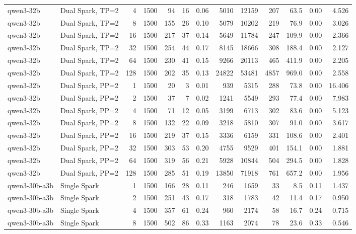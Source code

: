 \begin{tabular}{l l r r r r r r r r r r r}
qwen3-32b & Dual Spark, TP=2 & 4 & 1500 & 94\rlap{$^\dagger$} & 16 & 0.06 & 5010 & 12159 & 207 & 63.5 & 0.00 & 4.526 \\
qwen3-32b & Dual Spark, TP=2 & 8 & 1500 & 155 & 26 & 0.10 & 5079 & 10202 & 219 & 76.9 & 0.00 & 3.026 \\
qwen3-32b & Dual Spark, TP=2 & 16 & 1500 & 217 & 37 & 0.14 & 5649 & 11784 & 247 & 109.9 & 0.00 & 2.366 \\
qwen3-32b & Dual Spark, TP=2 & 32 & 1500 & 254 & 44 & 0.17 & 8145 & 18666 & 308 & 188.4 & 0.00 & 2.127 \\
qwen3-32b & Dual Spark, TP=2 & 64 & 1500 & 230 & 41 & 0.15 & 9266 & 20113 & 465 & 411.9 & 0.00 & 2.205 \\
qwen3-32b & Dual Spark, TP=2 & 128 & 1500 & 202 & 35 & 0.13 & 24822 & 53481 & 4857 & 969.0 & 0.00 & 2.558 \\
\addlinespace
qwen3-32b & Dual Spark, PP=2 & 1 & 1500 & 20\rlap{$^\dagger$} & 3 & 0.01 & 939 & 5315 & 288 & 73.8 & 0.00 & 16.406 \\
qwen3-32b & Dual Spark, PP=2 & 2 & 1500 & 37\rlap{$^\dagger$} & 7 & 0.02 & 1241 & 5549 & 293 & 77.4 & 0.00 & 7.983 \\
qwen3-32b & Dual Spark, PP=2 & 4 & 1500 & 71\rlap{$^\dagger$} & 12 & 0.05 & 3199 & 6713 & 302 & 83.6 & 0.00 & 5.123 \\
qwen3-32b & Dual Spark, PP=2 & 8 & 1500 & 132 & 22 & 0.09 & 3218 & 5810 & 307 & 91.0 & 0.00 & 3.617 \\
qwen3-32b & Dual Spark, PP=2 & 16 & 1500 & 219 & 37 & 0.15 & 3336 & 6159 & 331 & 108.6 & 0.00 & 2.401 \\
qwen3-32b & Dual Spark, PP=2 & 32 & 1500 & 303 & 53 & 0.20 & 4755 & 9529 & 401 & 154.1 & 0.00 & 1.881 \\
qwen3-32b & Dual Spark, PP=2 & 64 & 1500 & 319 & 56 & 0.21 & 5928 & 10844 & 504 & 294.5 & 0.00 & 1.828 \\
qwen3-32b & Dual Spark, PP=2 & 128 & 1500 & 285 & 51 & 0.19 & 13850 & 71918 & 761 & 657.2 & 0.00 & 1.956 \\
\addlinespace
qwen3-30b-a3b & Single Spark & 1 & 1500 & 166 & 28 & 0.11 & 246 & 1659 & 33 & 8.5 & 0.11 & 1.437 \\
qwen3-30b-a3b & Single Spark & 2 & 1500 & 251 & 43 & 0.17 & 318 & 1783 & 42 & 11.4 & 0.17 & 0.950 \\
qwen3-30b-a3b & Single Spark & 4 & 1500 & 357 & 61 & 0.24 & 960 & 2174 & 58 & 16.7 & 0.24 & 0.715 \\
qwen3-30b-a3b & Single Spark & 8 & 1500 & 502 & 86 & 0.33 & 1163 & 2074 & 78 & 23.6 & 0.33 & 0.546 \\

\end{tabular}
